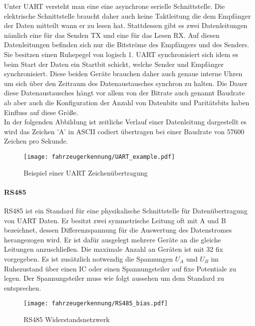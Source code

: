 Unter UART versteht man eine eine asynchrone serielle Schnittstelle. Die elektrische Schnittstelle braucht daher auch keine Taktleitung die dem Empfänger der Daten mitteilt wann er zu lesen hat. Stattdessen gibt es zwei Datenleitungen nämlich eine 
für das Senden TX und eine für das Lesen RX. Auf diesen Datenleitungen befinden sich nur die Bitströme des Empfängers und des Senders. Sie besitzen einen Ruhepegel von logisch 1.
UART synchronisiert sich idem es beim Start der Daten ein Startbit schickt, welche Sender und Empfänger synchronisiert. 
Diese beiden Geräte brauchen daher auch genaue interne Uhren um sich über den Zeitraum des Datenaustausches synchron zu halten.
Die Dauer diese Datenaustausches hängt vor allem von der Bitrate auch genannt Baudrate ab aber auch die Konfiguration der Anzahl von Datenbits und Paritätsbits haben Einfluss auf diese Größe. 
\\
In der folgenden Abbildung ist zeitliche Verlauf einer Datenleitung dargestellt es wird das Zeichen 'A' in ASCII codiert übertragen bei einer Baudrate von 57600 Zeichen pro Sekunde.

\begin{figure}[H]
    \centering
    \texttt{[image: fahrzeugerkennung/UART\_example.pdf]}
    \caption{Beispiel einer UART Zeichenübertragung}
\end{figure}

\paragraph{RS485}\label{sec:RS485}\mbox{}

RS485 ist ein Standard für eine physikalische Schnittstelle für Datenübertragung von UART Daten. Er besitzt zwei symmetrische Leitung oft mit A und B bezeichnet, dessen Differenzspannung für die Auswertung
des Datenstromes herangezogen wird. Er ist dafür ausgelegt mehrere Geräte an die gleiche Leitungen anzuschließen. Die maximale Anzahl an Geräten ist mit 32 fix vorgegeben. Es ist zusätzlich notwendig die Spannungen 
$U_{A}$ und $U_{B}$ im Ruhezustand über einen IC oder einen Spannungsteiler auf fixe Potentiale zu legen. Der Spannungsteiler muss wie folgt aussehen um dem Standard zu entsprechen.

\begin{figure}[H]
    \centering
    \texttt{[image: fahrzeugerkennung/RS485\_bias.pdf]}
    \caption{RS485 Widerstandsnetzwerk}
    \label{fig:rs485_bias}
\end{figure}

